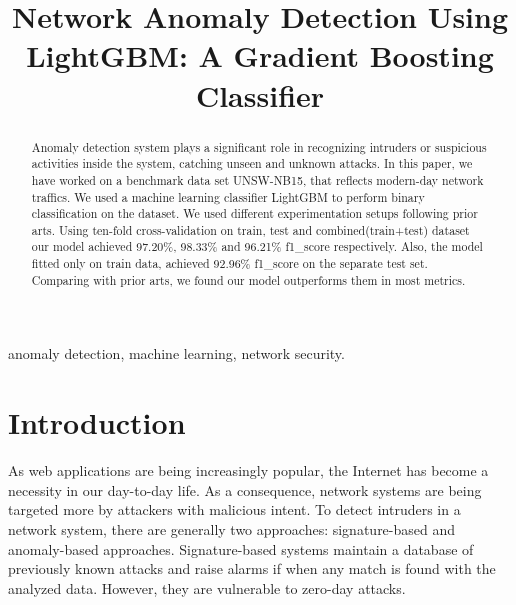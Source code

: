 \documentclass[14pt, conference]{IEEEtran}
\begin{document}
\title{Network Anomaly Detection Using LightGBM: A Gradient Boosting Classifier}

\author{

}

\maketitle

\begin{abstract}
Anomaly detection system plays a significant role in recognizing intruders or suspicious activities inside the system,
catching unseen and unknown attacks. In this paper, we have worked on a benchmark data set UNSW-NB15, that
reflects modern-day network traffics. We used a machine learning classifier LightGBM to perform binary classification
on the dataset. We used different experimentation setups following prior arts. Using ten-fold cross-validation on train,
test and combined(train+test) dataset our model achieved 97.20\%, 98.33\% and 96.21\% f1\_score respectively. Also, the
 model fitted only on train data, achieved 92.96\% f1\_score on the separate test set. Comparing with prior arts,
 we found our model outperforms them in most metrics.
\end{abstract}

\begin{IEEEkeywords}
anomaly detection, machine learning,  network security.
\end{IEEEkeywords}

\section{Introduction}
As web applications are being increasingly popular, the Internet has become a necessity in our day-to-day life. As a
consequence, network systems are being targeted more by attackers with malicious intent. To detect intruders in a
network system, there are generally two approaches: signature-based and anomaly-based approaches. Signature-based
systems maintain a database of previously known attacks and raise alarms if when any match is found with the analyzed
 data. However, they are vulnerable to zero-day attacks.
\end{document}
